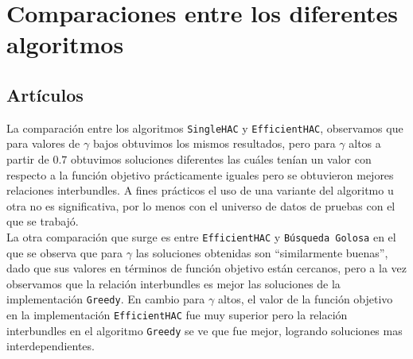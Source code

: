 \section{Comparaciones entre los diferentes algoritmos}\label{conc:compDifAlgo}
\subsection{Artículos}
La comparación entre los algoritmos \texttt{SingleHAC} y \texttt{EfficientHAC}, 
observamos que para valores de $\gamma$ bajos obtuvimos los mismos resultados, pero para $\gamma$ altos a 
partir de $0.7$ obtuvimos soluciones diferentes las cuáles tenían un valor con respecto a la 
función objetivo prácticamente iguales pero se obtuvieron mejores relaciones interbundles. A fines prácticos el uso de una variante del algoritmo u otra no es significativa, por lo menos con el universo de datos de pruebas con el que se trabajó.\\
La otra comparación que surge es entre \texttt{EfficientHAC} y \texttt{Búsqueda Golosa} en el que se observa 
que para $\gamma$ las soluciones obtenidas son \textquotedblleft similarmente 
buenas\textquotedblright , dado que sus valores en términos de función objetivo están cercanos, 
pero a la vez observamos que la relación interbundles es mejor las soluciones de la implementación 
\texttt{Greedy}. En cambio para $\gamma$ altos, el valor de la función objetivo en la 
implementación \texttt{EfficientHAC} fue muy superior pero la relación interbundles en el algoritmo 
\texttt{Greedy} se ve que fue mejor, logrando soluciones mas interdependientes.


